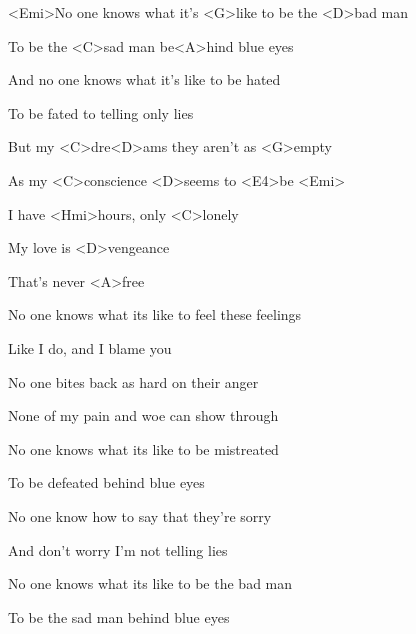 

\zs
<Emi>No one knows what it's <G>like
to be the <D>bad man

To be the <C>sad man
be<A>hind blue eyes

And no one knows
what it's like to be hated

To be fated to telling only lies
\ks

\zr
But my <C>dre<D>ams they aren't as <G>empty

As my <C>conscience <D>seems to <E4>be <Emi>

I have <Hmi>hours, only <C>lonely

My love is <D>vengeance

That's never <A>free
\kr

\zs
No one knows what its like
to feel these feelings

Like I do, and I blame you

No one bites back as hard on their anger

None of my pain and woe can show through
\ks

\zr \kr

\zs
No one knows what its like
to be mistreated

To be defeated behind blue eyes

No one know how to say that they're sorry

And don't worry I'm not telling lies
\ks

\zr \kr

\zs
No one knows what its like
to be the bad man

To be the sad man
behind blue eyes
\ks

\kp




